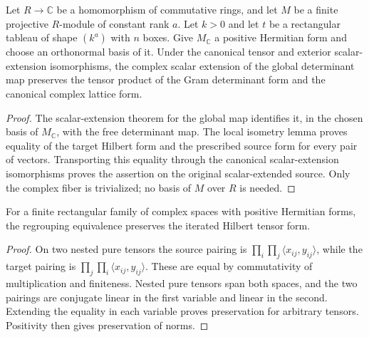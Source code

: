 \begin{lemma}
\label{lem:projective-determinant-isometry}
\leanok
Let $R\to\mathbb C$ be a homomorphism of commutative rings, and let $M$
be a finite projective $R$-module of constant rank $a$. Let $k>0$ and
let $t$ be a rectangular tableau of shape $(k^a)$ with $n$ boxes.
Give $M_{\mathbb C}$ a positive Hermitian form and choose an orthonormal
basis of it. Under the canonical tensor and exterior scalar-extension
isomorphisms, the complex scalar extension of the global determinant
map preserves the tensor product of the Gram determinant form
and the canonical complex lattice form.
\end{lemma}
\begin{proof}
The scalar-extension theorem for the global map identifies it,
in the chosen basis of $M_{\mathbb C}$, with the free determinant map.
The local isometry lemma proves equality of the target Hilbert form
and the prescribed source form for every pair of vectors. Transporting
this equality through the canonical scalar-extension isomorphisms
proves the assertion on the original scalar-extended source. Only the
complex fiber is trivialized; no basis of $M$ over $R$ is needed.
\end{proof}

\begin{lemma}
\label{lem:hilbert-regrouping}
\leanok
For a finite rectangular family of complex spaces with positive
Hermitian forms, the regrouping equivalence preserves the iterated
Hilbert tensor form.
\end{lemma}
\begin{proof}
On two nested pure tensors the source pairing is
$\prod_i\prod_j\langle x_{ij},y_{ij}\rangle$, while the target
pairing is $\prod_j\prod_i\langle x_{ij},y_{ij}\rangle$.
These are equal by commutativity of multiplication and finiteness.
Nested pure tensors span both spaces, and the two pairings are
conjugate linear in the first variable and linear in the second.
Extending the equality in each variable proves preservation for
arbitrary tensors. Positivity then gives preservation of norms.
\end{proof}

